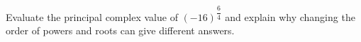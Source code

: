 Evaluate the principal complex value of $(-16)^{\dfrac{6}{4}}$ and explain why changing the order of powers and roots can give different answers.
